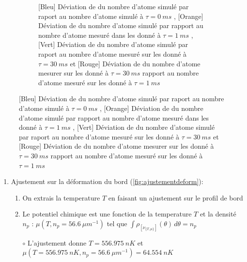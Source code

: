 \documentclass[a3, 10pt,twoside]{article}          %
\theoremstyle{plain}
\theoremstyle{definition}
\theoremstyle{remark}
\theoremstyle{definition} %
\def\OliveGreen{OliveGreen}
\begin{document}
\begin{figure}[H]
\begin{subfigure}[b]{0.45\textwidth}
        		\caption{{\color{blue}[Bleu] Déviation de du nombre d'atome simulé par raport au nombre d'atome simulé à $\tau = 0 ~ms$ } , {\color{orange}[Orange] Déviation de du nombre d'atome simulé par rapport au nombre d'atome mesuré dans les donné à $\tau = 1 ~ms$} ,  {\color{\OliveGreen}[Vert] Déviation de du nombre d'atome simulé par raport au nombre d'atome mesuré sur les donné à $\tau = 30 ~ms$} et {\color{red}[Rouge] Déviation de du nombre d'atome mesurer sur les donné à $\tau = 30 ~ms$ rapport au nombre d'atome mesuré sur les donné à $\tau = 1 ~ms$} }
        		\label{fig:nat}
    		\end{subfigure}
				
		\end{figure}
		
			\begin{enumerate}[label =\Alph*)]
				


				
				\item Ajustement sur la déformation du bord (\ref{fig:ajustementdeform}):

					\begin{enumerate}[label =\alph*)]
						\item On extrais la temperature $T$ en faisant un ajustement sur le profil de bord 
						\item Le potentiel chimique est une fonction de la temperature $T$ et la densité $n_p$ : $\mu( T , n_p = 56.6 ~{\mu m}^{-1} )$ tel que $\int \rho_{ [ \nu_{\{T,\mu\}} ] } (\theta) \, d \theta  = n_p $ 
						\item[$\circ$] L'ajustement donne $T = 556.975 ~nK$ et $\mu( T=556.975 ~nK , n_p = 56.6 ~{\mu m}^{-1} ) = 64.554~nK $ 
					\end{enumerate}
					

\end{enumerate}
\end{document}
